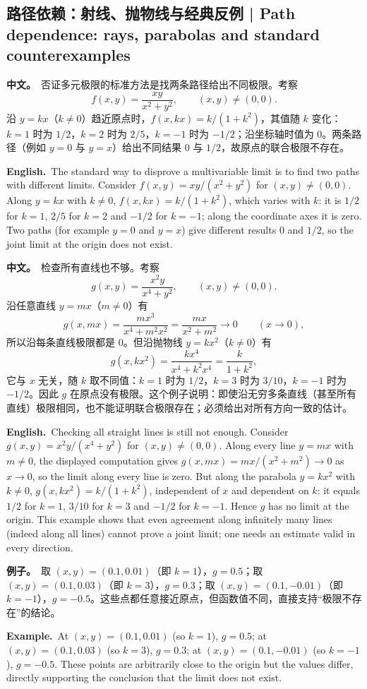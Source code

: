 \documentclass[UTF8,11pt,a4paper]{ctexart}
\newcommand{\BOTH}[2]{\par\noindent\textbf{中文。}\ #1\par\noindent\textbf{English.}\ #2\par}
\newcommand{\EX}[2]{\par\noindent\textbf{例子。}\ #1\par\noindent\textbf{Example.}\ #2\par}
\begin{document}
\subsection{路径依赖：射线、抛物线与经典反例 | Path dependence: rays, parabolas and standard counterexamples}
\BOTH{否证多元极限的标准方法是找两条路径给出不同极限。考察
\[
f(x,y)=\frac{xy}{x^2+y^2},\qquad (x,y)\ne(0,0).
\]
沿 $y=kx$（$k\ne0$）趋近原点时，$f(x,kx)=k/(1+k^2)$，其值随 $k$ 变化：$k=1$ 时为 $1/2$，$k=2$ 时为 $2/5$，$k=-1$ 时为 $-1/2$；沿坐标轴时值为 $0$。两条路径（例如 $y=0$ 与 $y=x$）给出不同结果 $0$ 与 $1/2$，故原点的联合极限不存在。}{The standard way to disprove a multivariable limit is to find two paths with different limits. Consider $f(x,y)=xy/(x^2+y^2)$ for $(x,y)\ne(0,0)$. Along $y=kx$ with $k\ne0$, $f(x,kx)=k/(1+k^2)$, which varies with $k$: it is $1/2$ for $k=1$, $2/5$ for $k=2$ and $-1/2$ for $k=-1$; along the coordinate axes it is zero. Two paths (for example $y=0$ and $y=x$) give different results $0$ and $1/2$, so the joint limit at the origin does not exist.}
\BOTH{检查所有直线也不够。考察
\[
g(x,y)=\frac{x^2y}{x^4+y^2},\qquad (x,y)\ne(0,0).
\]
沿任意直线 $y=mx$（$m\ne0$）有
\[
g(x,mx)=\frac{mx^3}{x^4+m^2x^2}=\frac{mx}{x^2+m^2}\longrightarrow0\qquad(x\to0),
\]
所以沿每条直线极限都是 $0$。但沿抛物线 $y=kx^2$（$k\ne0$）有
\[
g(x,kx^2)=\frac{kx^4}{x^4+k^2x^4}=\frac{k}{1+k^2},
\]
它与 $x$ 无关，随 $k$ 取不同值：$k=1$ 时为 $1/2$，$k=3$ 时为 $3/10$，$k=-1$ 时为 $-1/2$。因此 $g$ 在原点没有极限。这个例子说明：即使沿无穷多条直线（甚至所有直线）极限相同，也不能证明联合极限存在；必须给出对所有方向一致的估计。}{Checking all straight lines is still not enough. Consider $g(x,y)=x^2y/(x^4+y^2)$ for $(x,y)\ne(0,0)$. Along every line $y=mx$ with $m\ne0$, the displayed computation gives $g(x,mx)=mx/(x^2+m^2)\to0$ as $x\to0$, so the limit along every line is zero. But along the parabola $y=kx^2$ with $k\ne0$, $g(x,kx^2)=k/(1+k^2)$, independent of $x$ and dependent on $k$: it equals $1/2$ for $k=1$, $3/10$ for $k=3$ and $-1/2$ for $k=-1$. Hence $g$ has no limit at the origin. This example shows that even agreement along infinitely many lines (indeed along all lines) cannot prove a joint limit; one needs an estimate valid in every direction.}
\EX{取 $(x,y)=(0.1,0.01)$（即 $k=1$），$g=0.5$；取 $(x,y)=(0.1,0.03)$（即 $k=3$），$g=0.3$；取 $(x,y)=(0.1,-0.01)$（即 $k=-1$），$g=-0.5$。这些点都任意接近原点，但函数值不同，直接支持“极限不存在”的结论。}{At $(x,y)=(0.1,0.01)$ (so $k=1$), $g=0.5$; at $(x,y)=(0.1,0.03)$ (so $k=3$), $g=0.3$; at $(x,y)=(0.1,-0.01)$ (so $k=-1$), $g=-0.5$. These points are arbitrarily close to the origin but the values differ, directly supporting the conclusion that the limit does not exist.}
\end{document}
